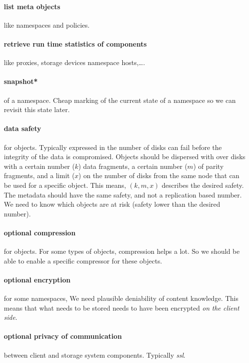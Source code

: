 \paragraph{list meta objects} like namespaces and policies.
\paragraph{retrieve run time statistics of components} like proxies,
storage devices namespace hosts,\ldots.

\paragraph{snapshot*} of a namespace.
Cheap marking of the current state of a namespace
so we can revisit this state later.

\paragraph{data safety} for objects.
Typically expressed in the number of disks can fail
before the integrity of the data is compromised.
Objects should be dispersed with over disks with
a certain number ($k$) data fragments, a certain number ($m$) of parity fragments,
and a limit ($x$) on the number of disks from the same node that can be used for a specific object. This means, $(k,m,x)$ describes the desired safety.
The metadata should have the same safety, and not a replication based number.
We need to know which objects are at risk (safety lower than the desired number).

\paragraph{optional compression} for objects.
For some types of objects, compression helps a lot.
So we should be able to enable a specific compressor for these objects.

\paragraph{optional encryption} for some namespaces,
We need plausible deniability of content knowledge.
This means that what needs to be stored needs to have been encrypted
\emph{on the client side}.

\paragraph{optional privacy of communication} between client and storage
system components. Typically \emph{ssl}.

